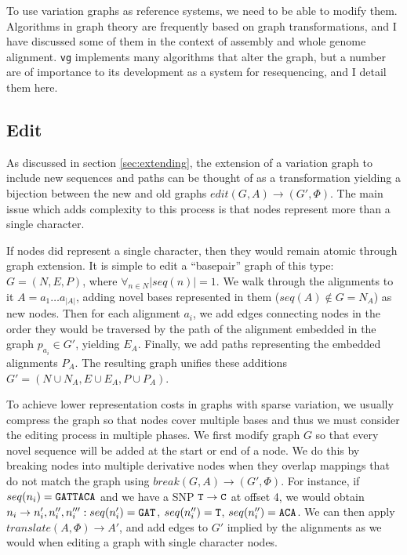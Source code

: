 To use variation graphs as reference systems, we need to be able to modify them.
Algorithms in graph theory are frequently based on graph transformations, and I have discussed some of them in the context of assembly and whole genome alignment.
{\tt vg} implements many algorithms that alter the graph, but a number are of importance to its development as a system for resequencing, and I detail them here.

\subsection{Edit}

As discussed in section \ref{sec:extending}, the extension of a variation graph to include new sequences and paths can be thought of as a transformation yielding a bijection between the new and old graphs $edit(G, A) \to (G', \Phi)$.
The main issue which adds complexity to this process is that nodes represent more than a single character.

If nodes did represent a single character, then they would remain atomic through graph extension.
It is simple to edit a ``basepair'' graph of this type: $G = (N, E, P)$, where $\forall_{n \in N}{|seq(n)| = 1}$.
We walk through the alignments to it $A = a_1\ldots a_{|A|}$, adding novel bases represented in them ($seq(A) \notin G = N_A$) as new nodes.
Then for each alignment $a_i$, we add edges connecting nodes in the order they would be traversed by the path of the alignment embedded in the graph $p_{a_i} \in G'$, yielding $E_A$.
Finally, we add paths representing the embedded alignments $P_A$.
The resulting graph unifies these additions $G' = (N \cup N_A, E \cup E_A, P \cup P_A)$.

To achieve lower representation costs in graphs with sparse variation, we usually compress the graph so that nodes cover multiple bases and thus we must consider the editing process in multiple phases.
We first modify graph $G$ so that every novel sequence will be added at the start or end of a node.
We do this by breaking nodes into multiple derivative nodes when they overlap mappings that do not match the graph using $break(G, A) \to (G', \Phi)$.
For instance, if $seq(n_i) = {\tt GATTACA}$ and we have a SNP ${\tt T} \to {\tt C}$ at offset 4, we would obtain $n_i \to n_i', n_i'', n_i''' : seq(n_i') = {\tt GAT} $, $seq(n_i'') = {\tt T}$, $seq(n_i'') = {\tt ACA}$.
We can then apply $translate(A, \Phi) \to A'$, and add edges to $G'$ implied by the alignments as we would when editing a graph with single character nodes.

